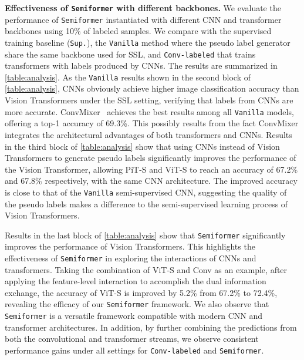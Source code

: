 \documentclass[runningheads]{llncs}
\makeatletter
\newcommand{\fakeparagraph}[1]{\textbf{#1}}
\newcommand*{\system}{\texttt{Semiformer}\@\xspace}
\newcommand*{\vanilla}{\texttt{Vanilla}\@\xspace}
\newcommand*{\convl}{\texttt{Conv-labeled}\@\xspace}
\newcommand*{\supervised}{\texttt{Sup.}\@\xspace}
\makeatother
\begin{document}
\fakeparagraph{Effectiveness of \system with different backbones.} We evaluate the performance of \system instantiated with different CNN and transformer backbones using 10\% of labeled samples. We compare with the supervised training baseline (\supervised), the \vanilla method where the pseudo label generator share the same backbone used for SSL, and \convl that trains transformers with labels produced by CNNs.  The results are summarized in \cref{table:analysis}. As the \vanilla results shown in the second block of \cref{table:analysis}, CNNs obviously achieve higher image classification accuracy than Vision Transformers under the SSL setting, verifying that labels from CNNs are more accurate. ConvMixer~\cite{trockman2022patches} achieves the best results among all \vanilla models, offering a top-1 accuracy of 69.3\%. This possibly results from the fact ConvMixer integrates the architectural advantages of both transformers and CNNs. Results in the third block of \cref{table:analysis} show that using CNNs instead of Vision Transformers to generate pseudo labels significantly improves the performance of the Vision Transformer, allowing PiT-S and ViT-S to reach an accuracy of 67.2\% and 67.8\% respectively, with the same CNN architecture. The improved accuracy is close to that of the \vanilla semi-supervised CNN, suggesting the quality of the pseudo labels makes a difference to the semi-supervised learning process of Vision Transformers. 

Results in the last block of \cref{table:analysis} show that \system significantly improves the performance of Vision Transformers. This highlights the effectiveness of \system in exploring the interactions of CNNs and transformers. Taking the combination of ViT-S and Conv as an example, after applying the feature-level interaction to accomplish the dual information exchange, the accuracy of ViT-S is improved by 5.2\% from 67.2\% to 72.4\%, revealing the efficacy of our \system framework. We also observe that \system is a versatile framework compatible with modern CNN and transformer architectures.  In addition, by further combining the predictions from both the convolutional and transformer streams, we observe consistent performance gains under all settings for \convl and \system.
\end{document}
